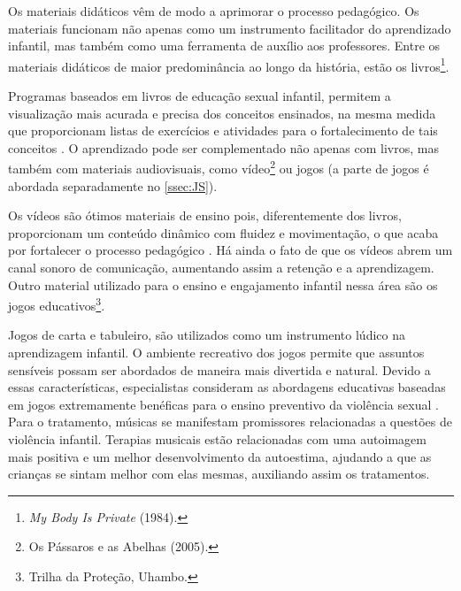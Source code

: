



Os materiais didáticos vêm de modo a aprimorar o processo pedagógico. Os materiais funcionam não apenas como um instrumento facilitador do aprendizado infantil, mas também como uma ferramenta de auxílio aos professores. Entre os materiais didáticos de maior predominância ao longo da história, estão os livros\footnote{\textit{My Body Is Private} (1984).}.

Programas baseados em livros de educação sexual infantil, permitem a visualização mais acurada e precisa dos conceitos ensinados, na mesma medida que proporcionam listas de exercícios e atividades para o fortalecimento de tais conceitos \cite{maria2010papel}. O aprendizado pode ser complementado não apenas com livros, mas também com materiais audiovisuais, como vídeo\footnote{Os Pássaros e as Abelhas (2005).} ou jogos (a parte de jogos é abordada separadamente no \autoref{ssec:JS}). 

 

Os vídeos são ótimos materiais de ensino pois, diferentemente dos livros, proporcionam um conteúdo dinâmico com fluidez e movimentação, o que acaba por fortalecer o processo pedagógico \cite{maria2010papel}. Há ainda o fato de que os vídeos abrem um canal sonoro de comunicação, aumentando assim a retenção e a aprendizagem. Outro material utilizado para o ensino e engajamento infantil nessa área são os jogos educativos\footnote{Trilha da Proteção, Uhambo.}. 

Jogos de carta e tabuleiro, %
são utilizados como um instrumento lúdico na aprendizagem infantil. O ambiente recreativo dos jogos permite que assuntos sensíveis possam ser abordados de maneira mais divertida e natural. Devido a essas características, especialistas consideram as abordagens educativas baseadas em jogos extremamente benéficas para o ensino preventivo da violência sexual \cite{meyer2017analise}. Para o tratamento, músicas se manifestam promissores relacionadas a questões de violência infantil. Terapias musicais estão relacionadas com uma autoimagem mais positiva e um melhor desenvolvimento da autoestima, ajudando a que as crianças se sintam melhor com elas mesmas, auxiliando assim os tratamentos. 


